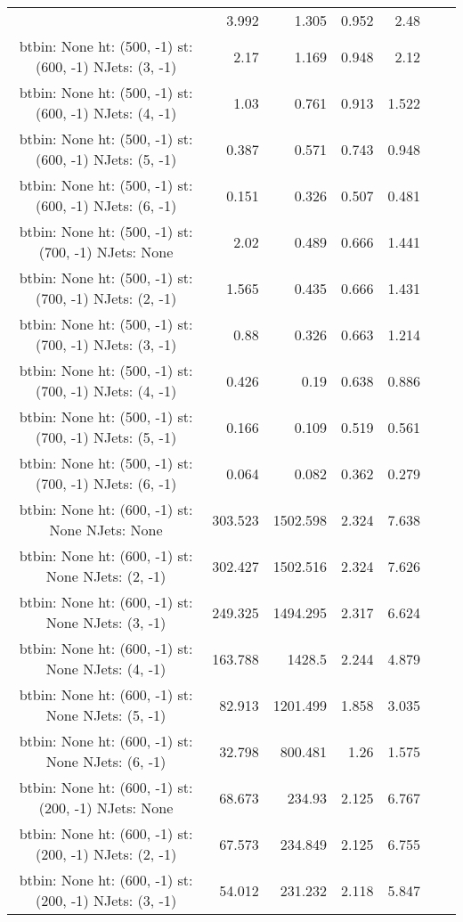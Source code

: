 \documentclass[12pt]{paper}
\begin{document}
\begin{landscape}
\begin{longtable}{c|r|r|r|r|r|r}
 & 3.992 & 1.305 & 0.952 & 2.48\\
btbin:  None ht:  (500, -1) st:  (600, -1) NJets:  (3, -1)
 & 2.17 & 1.169 & 0.948 & 2.12\\
btbin:  None ht:  (500, -1) st:  (600, -1) NJets:  (4, -1)
 & 1.03 & 0.761 & 0.913 & 1.522\\
btbin:  None ht:  (500, -1) st:  (600, -1) NJets:  (5, -1)
 & 0.387 & 0.571 & 0.743 & 0.948\\
btbin:  None ht:  (500, -1) st:  (600, -1) NJets:  (6, -1)
 & 0.151 & 0.326 & 0.507 & 0.481\\
btbin:  None ht:  (500, -1) st:  (700, -1) NJets:  None
 & 2.02 & 0.489 & 0.666 & 1.441\\
btbin:  None ht:  (500, -1) st:  (700, -1) NJets:  (2, -1)
 & 1.565 & 0.435 & 0.666 & 1.431\\
btbin:  None ht:  (500, -1) st:  (700, -1) NJets:  (3, -1)
 & 0.88 & 0.326 & 0.663 & 1.214\\
btbin:  None ht:  (500, -1) st:  (700, -1) NJets:  (4, -1)
 & 0.426 & 0.19 & 0.638 & 0.886\\
btbin:  None ht:  (500, -1) st:  (700, -1) NJets:  (5, -1)
 & 0.166 & 0.109 & 0.519 & 0.561\\
btbin:  None ht:  (500, -1) st:  (700, -1) NJets:  (6, -1)
 & 0.064 & 0.082 & 0.362 & 0.279\\
btbin:  None ht:  (600, -1) st:  None NJets:  None
 & 303.523 & 1502.598 & 2.324 & 7.638\\
btbin:  None ht:  (600, -1) st:  None NJets:  (2, -1)
 & 302.427 & 1502.516 & 2.324 & 7.626\\
btbin:  None ht:  (600, -1) st:  None NJets:  (3, -1)
 & 249.325 & 1494.295 & 2.317 & 6.624\\
btbin:  None ht:  (600, -1) st:  None NJets:  (4, -1)
 & 163.788 & 1428.5 & 2.244 & 4.879\\
btbin:  None ht:  (600, -1) st:  None NJets:  (5, -1)
 & 82.913 & 1201.499 & 1.858 & 3.035\\
btbin:  None ht:  (600, -1) st:  None NJets:  (6, -1)
 & 32.798 & 800.481 & 1.26 & 1.575\\
btbin:  None ht:  (600, -1) st:  (200, -1) NJets:  None
 & 68.673 & 234.93 & 2.125 & 6.767\\
btbin:  None ht:  (600, -1) st:  (200, -1) NJets:  (2, -1)
 & 67.573 & 234.849 & 2.125 & 6.755\\
btbin:  None ht:  (600, -1) st:  (200, -1) NJets:  (3, -1)
 & 54.012 & 231.232 & 2.118 & 5.847\\

\end{longtable}
\end{landscape}
\end{document}
